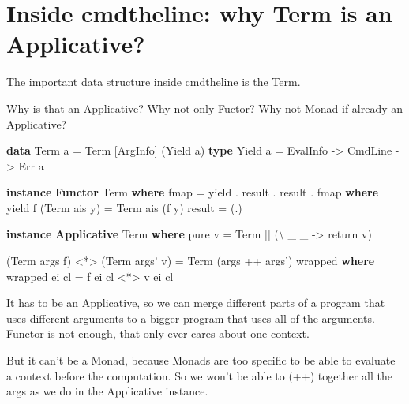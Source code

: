 \documentclass[]{article}
\newenvironment{Shaded}{}{}
\newcommand{\KeywordTok}[1]{\textcolor[rgb]{0.00,0.44,0.13}{\textbf{{#1}}}}
\newcommand{\DataTypeTok}[1]{\textcolor[rgb]{0.56,0.13,0.00}{{#1}}}
\newcommand{\OtherTok}[1]{\textcolor[rgb]{0.00,0.44,0.13}{{#1}}}
\newcommand{\FunctionTok}[1]{\textcolor[rgb]{0.02,0.16,0.49}{{#1}}}
\newcommand{\NormalTok}[1]{{#1}}
\begin{document}
\section{Inside cmdtheline: why Term is an Applicative?}

The important data structure inside cmdtheline is the Term.

Why is that an Applicative? Why not only Fuctor? Why not Monad if
already an Applicative?

\begin{Shaded}
\begin{Highlighting}[]
\KeywordTok{data} \DataTypeTok{Term} \NormalTok{a }\FunctionTok{=} \DataTypeTok{Term} \NormalTok{[}\DataTypeTok{ArgInfo}\NormalTok{] (}\DataTypeTok{Yield} \NormalTok{a)}
\KeywordTok{type} \DataTypeTok{Yield} \NormalTok{a }\FunctionTok{=} \DataTypeTok{EvalInfo} \OtherTok{->} \DataTypeTok{CmdLine} \OtherTok{->} \DataTypeTok{Err} \NormalTok{a}

\KeywordTok{instance} \KeywordTok{Functor} \DataTypeTok{Term} \KeywordTok{where}
  \FunctionTok{fmap} \FunctionTok{=} \NormalTok{yield }\FunctionTok{.} \NormalTok{result }\FunctionTok{.} \NormalTok{result }\FunctionTok{.} \FunctionTok{fmap}
    \KeywordTok{where}
    \NormalTok{yield f (}\DataTypeTok{Term} \NormalTok{ais y) }\FunctionTok{=} \DataTypeTok{Term} \NormalTok{ais (f y)}
    \NormalTok{result }\FunctionTok{=} \NormalTok{(}\FunctionTok{.}\NormalTok{)}

\KeywordTok{instance} \KeywordTok{Applicative} \DataTypeTok{Term} \KeywordTok{where}
  \NormalTok{pure v }\FunctionTok{=} \DataTypeTok{Term} \NormalTok{[] (\textbackslash{} _ _ }\OtherTok{->} \FunctionTok{return} \NormalTok{v)}

  \NormalTok{(}\DataTypeTok{Term} \NormalTok{args f) }\FunctionTok{<*>} \NormalTok{(}\DataTypeTok{Term} \NormalTok{args' v) }\FunctionTok{=} \DataTypeTok{Term} \NormalTok{(args }\FunctionTok{++} \NormalTok{args') wrapped}
    \KeywordTok{where}
    \NormalTok{wrapped ei cl }\FunctionTok{=} \NormalTok{f ei cl }\FunctionTok{<*>} \NormalTok{v ei cl}
\end{Highlighting}
\end{Shaded}

It has to be an Applicative, so we can merge different parts of a
program that uses different arguments to a bigger program that uses all
of the arguments. Functor is not enough, that only ever cares about one
context.

But it can't be a Monad, because Monads are too specific to be able to
evaluate a context before the computation. So we won't be able to (++)
together all the args as we do in the Applicative instance.
\end{document}
